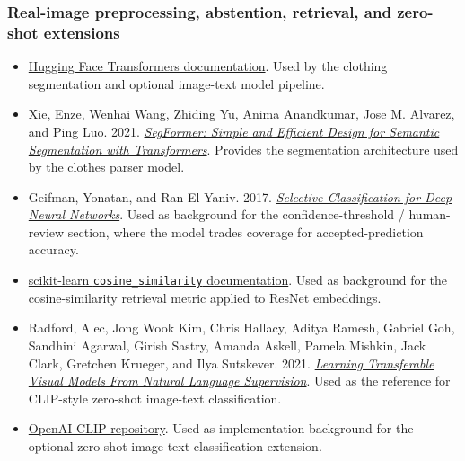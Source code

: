 \documentclass[11pt]{article}
\providecommand{\tightlist}{%
      \setlength{\itemsep}{0pt}\setlength{\parskip}{0pt}}
\begin{document}
\subsubsection{Real-image preprocessing, abstention, retrieval, and
zero-shot
extensions}\label{real-image-preprocessing-abstention-retrieval-and-zero-shot-extensions}

\begin{itemize}
\tightlist
\item
  \href{https://huggingface.co/docs/transformers/index}{Hugging Face
  Transformers documentation}. Used by the clothing segmentation and
  optional image-text model pipeline.
\item
  Xie, Enze, Wenhai Wang, Zhiding Yu, Anima Anandkumar, Jose M. Alvarez,
  and Ping Luo. 2021.
  \href{https://arxiv.org/abs/2105.15203}{\emph{SegFormer: Simple and
  Efficient Design for Semantic Segmentation with Transformers}}.
  Provides the segmentation architecture used by the clothes parser
  model.
\item
  Geifman, Yonatan, and Ran El-Yaniv. 2017.
  \href{https://arxiv.org/abs/1705.08500}{\emph{Selective Classification
  for Deep Neural Networks}}. Used as background for the
  confidence-threshold / human-review section, where the model trades
  coverage for accepted-prediction accuracy.
\item
  \href{https://scikit-learn.org/stable/modules/generated/sklearn.metrics.pairwise.cosine_similarity.html}{scikit-learn
  \texttt{cosine\_similarity} documentation}. Used as background for the
  cosine-similarity retrieval metric applied to ResNet embeddings.
\item
  Radford, Alec, Jong Wook Kim, Chris Hallacy, Aditya Ramesh, Gabriel
  Goh, Sandhini Agarwal, Girish Sastry, Amanda Askell, Pamela Mishkin,
  Jack Clark, Gretchen Krueger, and Ilya Sutskever. 2021.
  \href{https://arxiv.org/abs/2103.00020}{\emph{Learning Transferable
  Visual Models From Natural Language Supervision}}. Used as the
  reference for CLIP-style zero-shot image-text classification.
\item
  \href{https://github.com/openai/CLIP}{OpenAI CLIP repository}. Used as
  implementation background for the optional zero-shot image-text
  classification extension.
\end{itemize}


    
    
    
\end{document}
